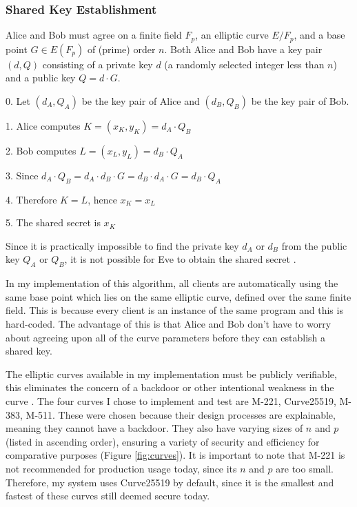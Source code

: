 \documentclass[12pt,a4paper]{article}
\begin{document}
\subsubsection{Shared Key Establishment} \noindent \label{SharedKey}
Alice and Bob must agree on a finite field $F_p$, an elliptic curve $E/F_p$, and a base point $G \in E(F_p)$  of (prime) order $n$.
Both Alice and Bob have a key pair $(d,Q)$ consisting of a private key $d$ (a randomly selected integer less than $n$) 
and a public key $Q = d \cdot G$.

\vspace{1mm}

0. \space Let $(d_A,Q_A)$ be the key pair of Alice and $(d_B,Q_B)$ be the key pair of Bob.

1. \space Alice computes $K = (x_K,y_K) = d_A \cdot Q_B$

2. \space Bob computes $L = (x_L,y_L) = d_B \cdot Q_A$

3. \space Since $d_A \cdot Q_B = d_A \cdot d_B \cdot G = d_B \cdot d_A \cdot G = d_B \cdot Q_A$

4. \space Therefore $K = L$, \space hence $x_K = x_L$

5. \space The shared secret is $x_K$

\vspace{1mm}

Since it is practically impossible to find the private key $d_A$ or $d_B$ from the public key $Q_A$ or $Q_B$, 
it is not possible for Eve to obtain the shared secret \cite{jurivsic1997elliptic,anoop2007elliptic,brown2009standards,silverman2009arithmetic}. 

\vspace{5mm}

In my implementation of this algorithm, all clients are automatically using the same base point which lies 
on the same elliptic curve, defined over the same finite field. 
This is because every client is an instance of the same program and this is hard-coded. 
The advantage of this is that Alice and Bob don't have to worry about agreeing upon all of the 
curve parameters before they can establish a shared key. 

The elliptic curves available in my implementation must be publicly verifiable, this eliminates the concern of a backdoor or other intentional weakness in the curve \cite{bernstein2013safecurves}. 
The four curves I chose to implement and test are M-221, Curve25519, M-383, M-511. 
These were chosen because their design processes are explainable, meaning they cannot have a backdoor. 
They also have varying sizes of $n$ and $p$ (listed in ascending order), ensuring a variety of security and efficiency for comparative purposes (Figure \ref{fig:curves}). 
It is important to note that M-221 is not recommended for production usage today, since its $n$ and $p$ are too small. 
Therefore, my system uses Curve25519 by default, since it is the smallest and fastest of these curves still deemed secure today. 
\end{document}
